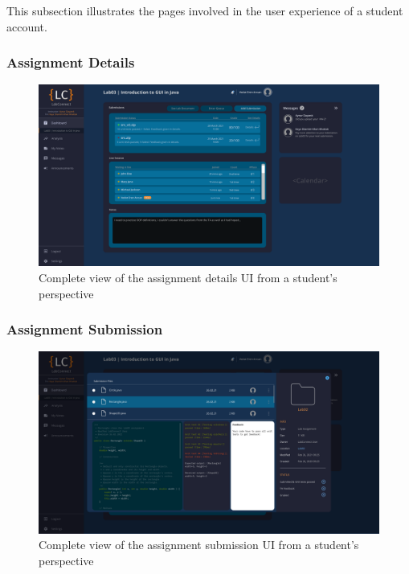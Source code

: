 \documentclass[a4paper, 12pt]{article}
\begin{document}
    This subsection illustrates the pages involved in the user experience of a student account.
    
    \subsubsection{Assignment Details}
    
    \begin{figure}[H]
        \centering
        \includegraphics[width=\textwidth]{student_assignment_details}
        \caption{Complete view of the assignment details UI from a student's perspective}
        \label{fig:student_assignment_details_full}
    \end{figure}

    
    
    
    
    
    
    
    
    \pagebreak
    
    \subsubsection{Assignment Submission}
    
    \begin{figure}[H]
        \centering
        \includegraphics[width=\textwidth]{student_assignment_submission}
        \caption{Complete view of the assignment submission UI from a student's perspective}
        \label{fig:student_assignment_submission_full}
    \end{figure}
\end{document}
